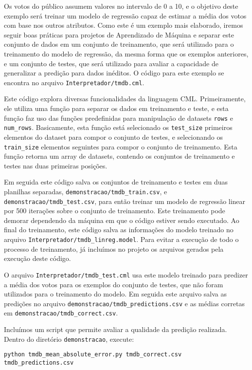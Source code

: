 \documentclass[12pt]{article}
\begin{document}
Os votos do público assumem valores no intervalo de 0 a 10, e o objetivo deste exemplo será treinar um modelo de regressão capaz de estimar a média dos votos com base nos outros atributos. Como este é um exemplo mais elaborado, iremos seguir boas práticas para projetos de Aprendizado de Máquina e separar este conjunto de dados em um conjunto de treinamento, que será utilizado para o treinamento do modelo de regressão, da mesma forma que os exemplos anteriores, e um conjunto de testes, que será utilizado para avaliar a capacidade de generalizar a predição para dados inéditos. O código para este exemplo se encontra no arquivo \texttt{Interpretador/tmdb.cml}.

Este código explora diversas funcionalidades da linguagem CML.  Primeiramente, ele utiliza uma função para separar os dados em treinamento e teste, e esta função faz uso das funções predefinidas para manipulação de datasets \texttt{rows} e \texttt{num\_rows}. Basicamente, esta função está selecionado os \texttt{test\_size} primeiros elementos do dataset para compor o conjunto de testes, e selecionando os \texttt{train\_size} elementos seguintes para compor o conjunto de treinamento. Esta função retorna um array de datasets, contendo os conjuntos de treinamento e testes nas duas primeiras posições.

Em seguida este código salva os conjuntos de treinamento e testes em duas planilhas separadas, \texttt{demonstracao/tmdb\_train.csv}, e \texttt{demonstracao/tmdb\_test.csv}, para então treinar um modelo de regressão linear por 500 iterações sobre o conjunto de treinamento. Este treinamento pode demorar dependendo da máquina em que o código estiver sendo executado. Ao final do treinamento, este código salva as informações do modelo treinado no arquivo \texttt{Interpretador/tmdb\_linreg.model}. Para evitar a execução de todo o processo de treinamento, já incluímos no projeto os arquivos gerados pela execução deste código.

O arquivo \texttt{Interpretador/tmdb\_test.cml} usa este modelo treinado para predizer a média dos votos para os exemplos do conjunto de testes, que não foram utilizados para o treinamento do modelo. Em seguida este arquivo salva as predições no arquivo \texttt{demonstracao/tmdb\_predictions.csv} e as médias corretas em \texttt{demonstracao/tmdb\_correct.csv}.

Incluímos um script que permite avaliar a qualidade da predição realizada. Dentro do diretório \texttt{demonstracao}, execute:

\begin{verbatim}
python tmdb_mean_absolute_error.py tmdb_correct.csv tmdb_predictions.csv
\end{verbatim}
\end{document}

